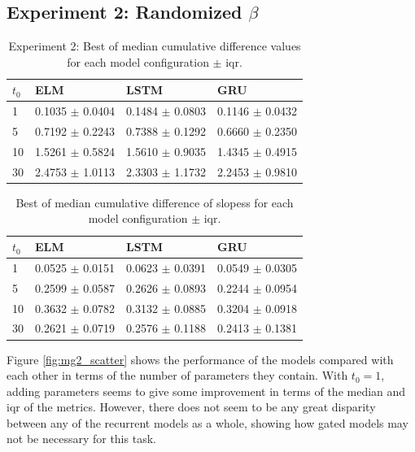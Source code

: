 \documentclass[11pt]{article}
\begin{document}
  \subsection {Experiment 2: Randomized $\beta$}
\begin{table}
  \begin{tabular}{|l|l|l|l|}
    \hline
    $t_0$ & ELM & LSTM & GRU \\
    \hline
    1 & 0.1035 $\pm$ 0.0404 &0.1484 $\pm$ 0.0803 &0.1146 $\pm$ 0.0432 \\
    5 & 0.7192 $\pm$ 0.2243 &0.7388 $\pm$ 0.1292 &0.6660 $\pm$ 0.2350 \\
    10 & 1.5261 $\pm$ 0.5824 &1.5610 $\pm$ 0.9035 &1.4345 $\pm$ 0.4915 \\
    30 & 2.4753 $\pm$ 1.0113 &2.3303 $\pm$ 1.1732 &2.2453 $\pm$ 0.9810 \\
    \hline
  \end{tabular}
  \caption{Experiment 2: Best of median cumulative difference values for each model
    configuration $\pm$ iqr.}
  \label{table:cumabs2}
\end{table}

\begin{table}
  \begin{tabular}{|l|l|l|l|}
    \hline
    $t_0$ & ELM & LSTM & GRU \\
    \hline
    1 & 0.0525  $\pm$ 0.0151 &0.0623 $\pm$ 0.0391 &0.0549 $\pm$ 0.0305 \\
    5 & 0.2599  $\pm$ 0.0587 &0.2626 $\pm$ 0.0893 &0.2244 $\pm$ 0.0954 \\
    10 & 0.3632  $\pm$ 0.0782 &0.3132 $\pm$ 0.0885 &0.3204 $\pm$ 0.0918 \\
    30 & 0.2621  $\pm$ 0.0719 &0.2576 $\pm$ 0.1188 &0.2413 $\pm$ 0.1381 \\
    \hline
  \end{tabular}
  \caption{Best of median cumulative difference of slopess for each
    model configuration $\pm$ iqr.}
  \label{table:Dcumabs2}
\end{table}
                                                          

Figure \ref{fig:mg2_scatter} shows the performance of the models
compared with each other in terms of the number of parameters they
contain. With $t_0 = 1$, adding parameters seems to give some
improvement in terms of the median and iqr of the metrics. However, there
does not seem to be any great disparity between any of the recurrent
models as a whole, showing how gated models may not be necessary for this task.
\end{document}
